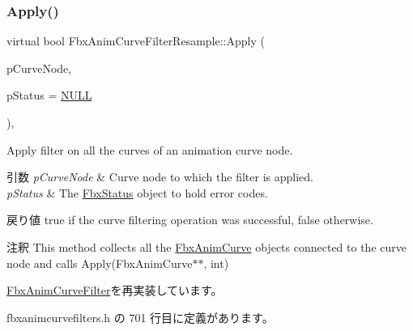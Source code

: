 \subsubsection{\texorpdfstring{Apply()}{Apply()}\hspace{0.1cm}{\footnotesize\ttfamily [3/5]}}
{\footnotesize\ttfamily virtual bool Fbx\+Anim\+Curve\+Filter\+Resample\+::\+Apply (\begin{DoxyParamCaption}\item[{\hyperlink{class_fbx_anim_curve_node}{Fbx\+Anim\+Curve\+Node} \&}]{p\+Curve\+Node,  }\item[{\hyperlink{class_fbx_status}{Fbx\+Status} $\ast$}]{p\+Status = {\ttfamily \hyperlink{fbxarch_8h_a070d2ce7b6bb7e5c05602aa8c308d0c4}{N\+U\+LL}} }\end{DoxyParamCaption})\hspace{0.3cm}{\ttfamily [inline]}, {\ttfamily [virtual]}}

Apply filter on all the curves of an animation curve node. 
\begin{DoxyParams}{引数}
{\em p\+Curve\+Node} & Curve node to which the filter is applied. \\
\hline
{\em p\+Status} & The \hyperlink{class_fbx_status}{Fbx\+Status} object to hold error codes. \\
\hline
\end{DoxyParams}
\begin{DoxyReturn}{戻り値}
{\ttfamily true} if the curve filtering operation was successful, {\ttfamily false} otherwise. 
\end{DoxyReturn}
\begin{DoxyRemark}{注釈}
This method collects all the \hyperlink{class_fbx_anim_curve}{Fbx\+Anim\+Curve} objects connected to the curve node and calls Apply(\+Fbx\+Anim\+Curve$\ast$$\ast$, int) 
\end{DoxyRemark}


\hyperlink{class_fbx_anim_curve_filter_ad042b45c0675278fa49e61739b0825c2}{Fbx\+Anim\+Curve\+Filter}を再実装しています。



 fbxanimcurvefilters.\+h の 701 行目に定義があります。

\mbox{\label{class_fbx_anim_curve_filter_resample_a2a095982e24a1ea1e35bc1ab97e833d7}} 
